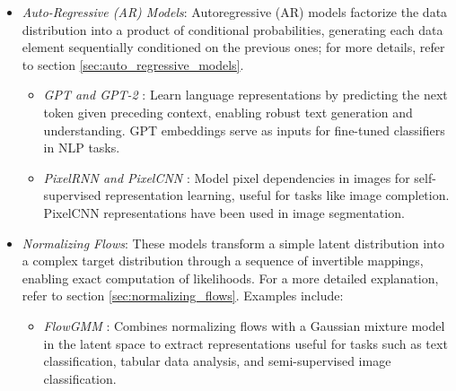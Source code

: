 \begin{itemize}
    \item \emph{Auto-Regressive (AR) Models}: Autoregressive (AR) models factorize the data distribution into a product of conditional probabilities, generating each data element sequentially conditioned on the previous ones; for more details, refer to section \ref{sec:auto_regressive_models}.
    \begin{itemize}
        \item \emph{GPT and GPT-2} \citep{radford2019language}: Learn language representations by predicting the next token given preceding context, enabling robust text generation and understanding. GPT embeddings serve as inputs for fine-tuned classifiers in NLP tasks.
        \item \emph{PixelRNN and PixelCNN} \citep{oord2016pixel}: Model pixel dependencies in images for self-supervised representation learning, useful for tasks like image completion. PixelCNN representations have been used in image segmentation.
    \end{itemize}

    \item \emph{Normalizing Flows}: These models transform a simple latent distribution into a complex target distribution through a sequence of invertible mappings, enabling exact computation of likelihoods. For a more detailed explanation, refer to section \ref{sec:normalizing_flows}. Examples include:
\begin{itemize}
    \item \emph{FlowGMM} \citep{izmailov2021flowgmm}: Combines normalizing flows with a Gaussian mixture model in the latent space to extract representations useful for tasks such as text classification, tabular data analysis, and semi-supervised image classification.
\end{itemize}


\end{itemize}

